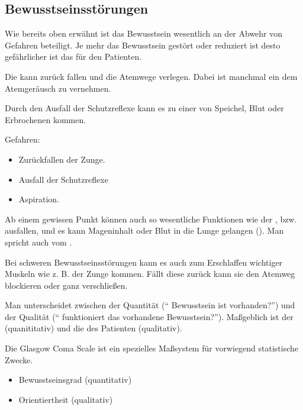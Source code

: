 \subsection{Bewusstseinsstörungen}
\label{topic:bewusstseinsstoerung}



{
Wie bereits oben erwähnt ist das Bewusstsein wesentlich an der Abwehr
von Gefahren beteiligt. Je mehr das Bewusstsein gestört oder
reduziert ist desto gefährlicher ist das für den Patienten. 

Die  kann zurück fallen und die Atemwege
verlegen. Dabei ist manchmal ein dem
 Atemgeräusch zu
vernehmen. 

Durch den Ausfall  der
Schutzreflexe kann es zu einer
 von Speichel, Blut oder Erbrochenen kommen. 
}{
Gefahren:
\begin{itemize}
  \item Zurückfallen der Zunge.
  \item Ausfall der Schutzreflexe
  \item Aspiration.
\end{itemize}
}{}{}{}

{
Ab einem gewissen Punkt können auch so wesentliche
Funktionen wie der ,  bzw. 
ausfallen, und es kann Mageninhalt oder Blut in die
Lunge gelangen (). Man spricht auch vom
.

Bei schweren Bewusstseinsstörungen kann es auch zum Erschlaffen
wichtiger Muskeln wie z. B. der Zunge kommen. Fällt
diese zurück kann sie den Atemweg blockieren oder ganz verschließen.
}{}{}{}{}




{
Man unterscheidet zwischen der Quantität ("` Bewusstsein ist
vorhanden?"') und der Qualität ("` funktioniert das vorhandene
Bewusstsein?"'). Maßgeblich ist der  (quanititativ) und
die  des Patienten (qualitativ). 

Die Glasgow Coma Scale ist ein spezielles Maßsystem für vorwiegend statistische
Zwecke. 
}{
\begin{itemize}
  \item Bewusstseinsgrad (quantitativ)
  \item Orientiertheit (qualitativ)
\end{itemize}
}{}{}{}

